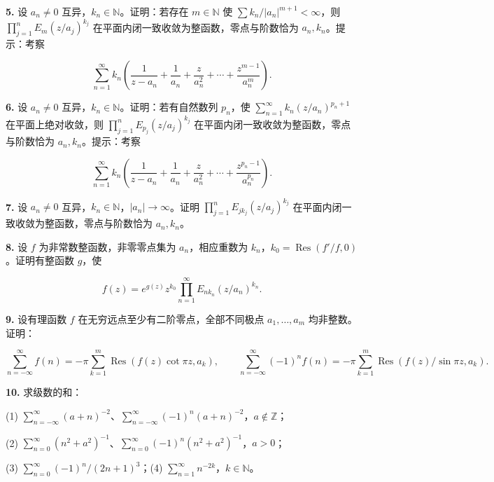 \documentclass[11pt,a4paper]{article}
\begin{document}
\par{}
\noindent\textbf{5.} 设 \(a_n\ne0\) 互异，\(k_n\in\mathbb N\)。证明：若存在
\(m\in\mathbb N\) 使 \(\sum k_n/|a_n|^{m+1}<\infty\)，则
\(\prod_{j=1}^nE_m(z/a_j)^{k_j}\)
在平面内闭一致收敛为整函数，零点与阶数恰为 \(a_n,k_n\)。提示：考察

\[
\sum_{n=1}^\infty k_n\left(\frac1{z-a_n}+\frac1{a_n}+\frac z{a_n^2}+\cdots+\frac{z^{m-1}}{a_n^m}\right).
\]

\par{}
\noindent\textbf{6.} 设 \(a_n\ne0\) 互异，\(k_n\in\mathbb N\)。证明：若有自然数列
\(p_n\)，使 \(\sum_{n=1}^\infty k_n(z/a_n)^{p_n+1}\)
在平面上绝对收敛，则 \(\prod_{j=1}^nE_{p_j}(z/a_j)^{k_j}\)
在平面内闭一致收敛为整函数，零点与阶数恰为 \(a_n,k_n\)。提示：考察

\[
\sum_{n=1}^\infty k_n\left(\frac1{z-a_n}+\frac1{a_n}+\frac z{a_n^2}+\cdots+\frac{z^{p_n-1}}{a_n^{p_n}}\right).
\]

\par{}
\noindent\textbf{7.} 设 \(a_n\ne0\)
互异，\(k_n\in\mathbb N\)，\(|a_n|\to\infty\)。证明
\(\prod_{j=1}^nE_{jk_j}(z/a_j)^{k_j}\)
在平面内闭一致收敛为整函数，零点与阶数恰为 \(a_n,k_n\)。

\par{}
\noindent\textbf{8.} 设 \(f\) 为非常数整函数，非零零点集为 \(a_n\)，相应重数为
\(k_n\)，\(k_0=\operatorname{Res}(f'/f,0)\)。证明有整函数 \(g\)，使

\[
f(z)=e^{g(z)}z^{k_0}\prod_{n=1}^\infty E_{nk_n}(z/a_n)^{k_n}.
\]

\par{}
\noindent\textbf{9.} 设有理函数 \(f\) 在无穷远点至少有二阶零点，全部不同极点
\(a_1,\ldots,a_m\) 均非整数。证明：

\[
\sum_{n=-\infty}^\infty f(n)=-\pi\sum_{k=1}^m\operatorname{Res}(f(z)\cot\pi z,a_k),\qquad
\sum_{n=-\infty}^\infty(-1)^nf(n)=-\pi\sum_{k=1}^m\operatorname{Res}(f(z)/\sin\pi z,a_k).
\]

\par{}
\noindent\textbf{10.} 求级数的和：

(1)
\(\sum_{n=-\infty}^\infty(a+n)^{-2}\)、\(\sum_{n=-\infty}^\infty(-1)^n(a+n)^{-2}\)，\(a\notin\mathbb Z\)；

(2)
\(\sum_{n=0}^\infty(n^2+a^2)^{-1}\)、\(\sum_{n=0}^\infty(-1)^n(n^2+a^2)^{-1}\)，\(a>0\)；

(3) \(\sum_{n=0}^\infty(-1)^n/(2n+1)^3\)；(4)
\(\sum_{n=1}^\infty n^{-2k}\)，\(k\in\mathbb N\)。
\end{document}
